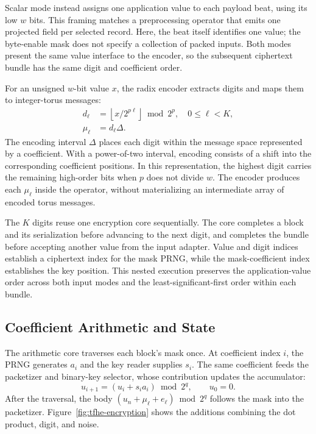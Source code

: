 \documentclass[sigconf,anonymous,balance=false]{acmart}
\begin{document}
Scalar mode instead assigns one application value to each payload beat, using its low $w$ bits. This framing matches a preprocessing operator that emits one projected field per selected record. Here, the beat itself identifies one value; the byte-enable mask does not specify a collection of packed inputs. Both modes present the same value interface to the encoder, so the subsequent ciphertext bundle has the same digit and coefficient order.

For an unsigned $w$-bit value $x$, the radix encoder extracts digits and maps them to integer-torus messages:
\begin{equation}
  \begin{aligned}
    d_\ell &= \left\lfloor x/2^{p\ell}\right\rfloor \bmod 2^p,\quad 0\leq\ell<K,\\
    \mu_\ell &= d_\ell\Delta.
  \end{aligned}
  \label{eq:tfhe-radix-encoding}
\end{equation}
The encoding interval $\Delta$ places each digit within the message space represented by a coefficient. With a power-of-two interval, encoding consists of a shift into the corresponding coefficient positions. In this representation, the highest digit carries the remaining high-order bits when $p$ does not divide $w$. The encoder produces each $\mu_\ell$ inside the operator, without materializing an intermediate array of encoded torus messages.

The $K$ digits reuse one encryption core sequentially. The core completes a block and its serialization before advancing to the next digit, and completes the bundle before accepting another value from the input adapter. Value and digit indices establish a ciphertext index for the mask PRNG, while the mask-coefficient index establishes the key position. This nested execution preserves the application-value order across both input modes and the least-significant-first order within each bundle.

\subsection{Coefficient Arithmetic and State}
\label{subsec:tfhe-coefficient-arithmetic}

The arithmetic core traverses each block's mask once. At coefficient index $i$, the PRNG generates $a_i$ and the key reader supplies $s_i$. The same coefficient feeds the packetizer and binary-key selector, whose contribution updates the accumulator:
\begin{equation}
  u_{i+1}=(u_i+s_i a_i)\bmod 2^q,\qquad u_0=0.
  \label{eq:tfhe-encryption-accumulation}
\end{equation}
After the traversal, the body $(u_n+\mu_\ell+e_\ell)\bmod 2^q$ follows the mask into the packetizer. Figure~\ref{fig:tfhe-encryption} shows the additions combining the dot product, digit, and noise.
\end{document}
